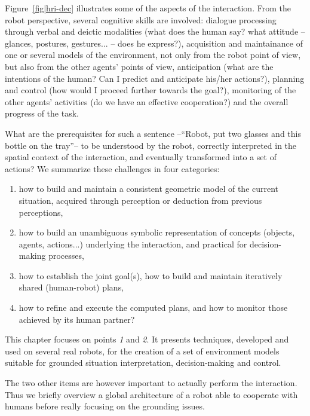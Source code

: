 \documentclass{svmult}
\begin{document}
Figure~\ref{fig|hri-dec} illustrates some of the aspects of the interaction.
From the robot perspective, several cognitive skills are involved: dialogue
processing through verbal and deictic modalities (what does the human say? what
attitude -- glances, postures, gestures... -- does he express?), acquisition
and maintainance of one or several models of the environment, not only from the
robot point of view, but also from the other agents' points of view,
anticipation (what are the intentions of the human? Can I predict and
anticipate his/her actions?), planning and control (how would I proceed further
towards the goal?), monitoring of the other agents' activities (do we have an
effective cooperation?) and the overall progress of the task. 

What are the prerequisites for such a sentence --``Robot, put two glasses and
this bottle on the tray''-- to be understood by the robot, correctly
interpreted in the spatial context of the interaction, and eventually
transformed into a set of actions? We summarize these challenges in four
categories:

\begin{enumerate}

	\item how to build and maintain a consistent geometric model of the current
	situation, acquired through perception or deduction from previous
	perceptions,

	\item how to build an unambiguous symbolic representation of concepts
	(objects, agents, actions...) underlying the interaction, and practical for
	decision-making processes,

	\item how to establish the joint goal(s), how to build and maintain
	iteratively shared (human-robot) plans, 

	\item how to refine and execute the computed plans, and how to monitor
	those achieved by its human partner?

\end{enumerate}


This chapter focuses on points {\it 1} and {\it 2}. It presents techniques,
developed and used on several real robots, for the creation of a set of
environment models suitable for grounded situation interpretation,
decision-making and control.

The two other items are however important to actually perform the interaction.
Thus we briefly overview a global architecture of a robot able to cooperate
with humans before really focusing on the grounding issues.
\end{document}
